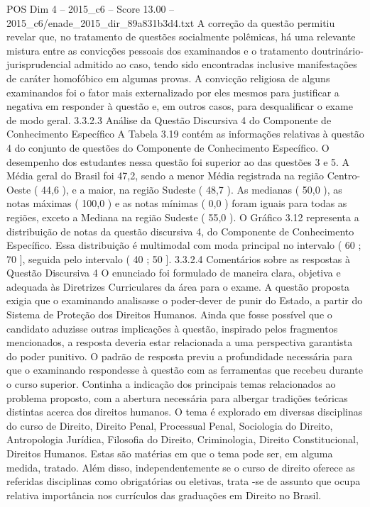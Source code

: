 \begin{textsample}{POS Dim 4 – 2015\_c6 – Score 13.00 – 2015\_c6/enade\_2015\_dir\_89a831b3d4.txt}
A correção da questão permitiu revelar que, no tratamento de questões socialmente polêmicas, há uma relevante mistura entre as convicções pessoais dos examinandos e o tratamento doutrinário-jurisprudencial admitido ao caso, tendo sido encontradas inclusive manifestações de caráter homofóbico em algumas provas.
A convicção religiosa de alguns examinandos foi o fator mais externalizado por eles mesmos para justificar a negativa em responder à questão e, em outros casos, para desqualificar o exame de modo geral. 3.3.2.3 Análise da Questão Discursiva 4 do Componente de Conhecimento Específico A Tabela 3.19 contém as informações relativas à questão 4 do conjunto de questões do Componente de Conhecimento Específico.
O desempenho dos estudantes nessa questão foi superior ao das questões 3 e 5.
A Média geral do Brasil foi 47,2, sendo a menor Média registrada na região Centro-Oeste ( 44,6 ), e a maior, na região Sudeste ( 48,7 ).
As medianas ( 50,0 ), as notas máximas ( 100,0 ) e as notas mínimas ( 0,0 ) foram iguais para todas as regiões, exceto a Mediana na região Sudeste ( 55,0 ).
O Gráfico 3.12 representa a distribuição de notas da questão discursiva 4, do Componente de Conhecimento Específico.
Essa distribuição é multimodal com moda principal no intervalo ( 60 ; 70 ], seguida pelo intervalo ( 40 ; 50 ]. 3.3.2.4 Comentários sobre as respostas à Questão Discursiva 4 O enunciado foi formulado de maneira clara, objetiva e adequada às Diretrizes Curriculares da área para o exame.
A questão proposta exigia que o examinando analisasse o poder-dever de punir do Estado, a partir do Sistema de Proteção dos Direitos Humanos.
Ainda que fosse possível que o candidato aduzisse outras implicações à questão, inspirado pelos fragmentos mencionados, a resposta deveria estar relacionada a uma perspectiva garantista do poder punitivo.
O padrão de resposta previu a profundidade necessária para que o examinando respondesse à questão com as ferramentas que recebeu durante o curso superior.
Continha a indicação dos principais temas relacionados ao problema proposto, com a abertura necessária para albergar tradições teóricas distintas acerca dos direitos humanos.
O tema é explorado em diversas disciplinas do curso de Direito, Direito Penal, Processual Penal, Sociologia do Direito, Antropologia Jurídica, Filosofia do Direito, Criminologia, Direito Constitucional, Direitos Humanos.
Estas são matérias em que o tema pode ser, em alguma medida, tratado.
Além disso, independentemente se o curso de direito oferece as referidas disciplinas como obrigatórias ou eletivas, trata -se de assunto que ocupa relativa importância nos currículos das graduações em Direito no Brasil.

\end{textsample}
